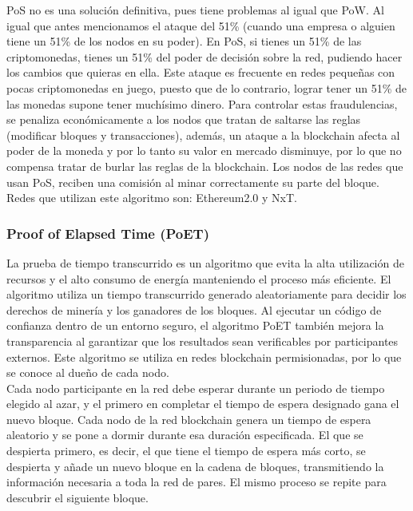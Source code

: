 PoS no es una solución definitiva, pues tiene problemas al igual que PoW. Al igual que antes mencionamos el ataque del 51\% (cuando una empresa o alguien tiene un 51\% de los nodos en su poder). En PoS, si tienes un 51\% de las criptomonedas, tienes un 51\% del poder de decisión sobre la red, pudiendo hacer los cambios que quieras en ella. Este ataque es frecuente en redes pequeñas con pocas criptomonedas en juego, puesto que de lo contrario, lograr tener un 51\% de las monedas supone tener muchísimo dinero. Para controlar estas fraudulencias, se penaliza económicamente a los nodos que tratan de saltarse las reglas (modificar bloques y transacciones), además, un ataque a la blockchain afecta al poder de la moneda y por lo tanto su valor en mercado disminuye, por lo que no compensa tratar de burlar las reglas de la blockchain. Los nodos de las redes que usan PoS, reciben una comisión al minar correctamente su parte del bloque. \\

Redes que utilizan este algoritmo son: Ethereum2.0\cite{Ethereum2.0} y NxT\cite{NxT}.

\subsubsection{Proof of Elapsed Time (PoET)}

La prueba de tiempo transcurrido es un algoritmo que evita la alta utilización de recursos y el alto consumo de energía manteniendo el proceso más eficiente. El algoritmo utiliza un tiempo transcurrido generado aleatoriamente para decidir los derechos de minería y los ganadores de los bloques. Al ejecutar un código de confianza dentro de un entorno seguro, el algoritmo PoET también mejora la transparencia al garantizar que los resultados sean verificables por participantes externos. Este algoritmo se utiliza en redes blockchain permisionadas, por lo que se conoce al dueño de cada nodo. \\

Cada nodo participante en la red debe esperar durante un periodo de tiempo elegido al azar, y el primero en completar el tiempo de espera designado gana el nuevo bloque. Cada nodo de la red blockchain genera un tiempo de espera aleatorio y se pone a dormir durante esa duración especificada. El que se despierta primero, es decir, el que tiene el tiempo de espera más corto, se despierta y añade un nuevo bloque en la cadena de bloques, transmitiendo la información necesaria a toda la red de pares. El mismo proceso se repite para descubrir el siguiente bloque. \\

